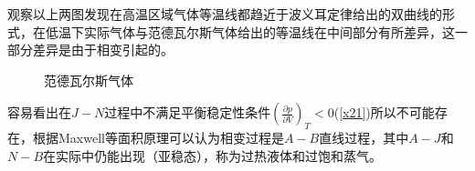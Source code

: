 \documentclass[12pt]{article}
\begin{document}
观察以上两图发现在高温区域气体等温线都趋近于波义耳定律给出的双曲线的形式，在低温下实际气体与范德瓦尔斯气体给出的等温线在中间部分有所差异，这一部分差异是由于相变引起的。
\begin{figure}[H]
	\centering
	\quad\quad\quad
	\caption{范德瓦尔斯气体}
\end{figure}
容易看出在$J-N$过程中不满足平衡稳定性条件$(\frac{\partial p}{\partial V})_T<0$(\ref{x21})所以不可能存在，根据Maxwell等面积原理可以认为相变过程是$A-B$直线过程，其中$A-J$和$N-B$在实际中仍能出现（亚稳态），称为过热液体和过饱和蒸气。\\
\end{document}
